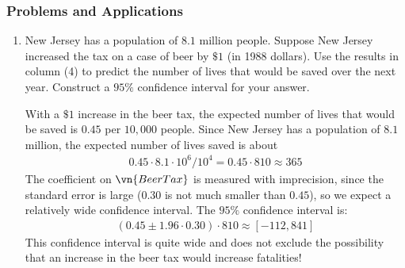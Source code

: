 \begin{frame}
\frametitle{Problems and Applications}

\begin{enumerate}\setcounter{enumi}{0}

\item New Jersey has a population of $8.1$ million people. Suppose New Jersey increased the tax on a case of beer by $\$1$ (in 1988 dollars). Use the results in column (4) to predict the number of lives that would be saved over the next year. Construct a $95\%$ confidence interval for your answer.

\begin{answer}
With a $\$1$ increase in the beer tax, the expected number of lives that would be saved is $0.45$ per $10,000$ people. Since New Jersey has a population of $8.1$ million, the expected number of lives saved is about
\begin{align*}
0.45 \cdot 8.1 \cdot 10^{6}/10^{4} 
    = 0.45 \cdot 810 \approx 365
\end{align*}
The coefficient on $\vn{BeerTax}$ is measured with imprecision, since the standard error is large ($0.30$ is not much smaller than $0.45$), so we expect a relatively wide confidence interval. The $95\%$ confidence interval is:
\begin{align*}
(0.45 \pm 1.96 \cdot 0.30) \cdot 810 
\approx [-112, 841]
\end{align*}
This confidence interval is quite wide and does not exclude the possibility that an increase in the beer tax would increase fatalities! 
\end{answer}

\end{enumerate}

\end{frame}



